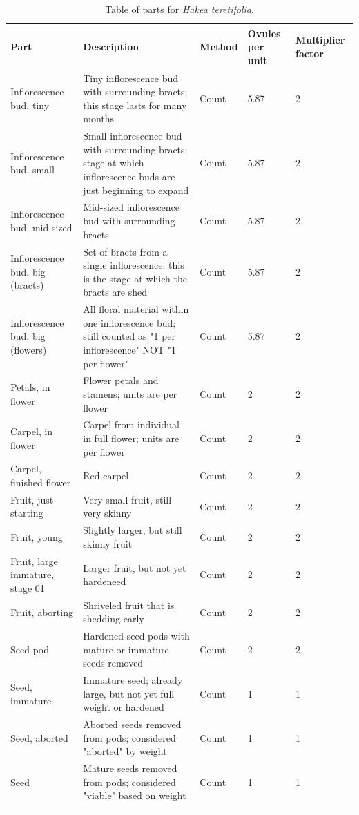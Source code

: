 \documentclass[10pt,twoside]{article}\usepackage[]{graphicx}\usepackage[]{color}
\begin{document}
\clearpage

\begingroup\small
\begin{longtable}{p{4.5cm}p{6cm}p{2cm}p{1cm}p{1cm}}
\caption{Table of parts for \emph{Hakea teretifolia}.} \\ 
  \hline
Part & Description & Method & Ovules per unit & Multiplier factor \\ 
  \hline
Inflorescence bud, tiny & Tiny inflorescence bud with surrounding bracts; this stage lasts for many months & Count & 5.87 &   2 \\ 
  Inflorescence bud, small & Small inflorescence bud with surrounding bracts; stage at which inflorescence buds are just beginning to expand & Count & 5.87 &   2 \\ 
  Inflorescence bud, mid-sized & Mid-sized inflorescence bud with surrounding bracts & Count & 5.87 &   2 \\ 
  Inflorescence bud, big (bracts) & Set of bracts from a single inflorescence; this is the stage at which the bracts are shed & Count & 5.87 &   2 \\ 
  Inflorescence bud, big (flowers) & All floral material within one inflorescence bud; still counted as "1 per inflorescence" NOT "1 per flower" & Count & 5.87 &   2 \\ 
  Petals, in flower & Flower petals and stamens; units are per flower & Count & 2 &   2 \\ 
  Carpel, in flower & Carpel from individual in full flower; units are per flower & Count & 2 &   2 \\ 
  Carpel, finished flower & Red carpel & Count & 2 &   2 \\ 
  Fruit, just starting & Very small fruit, still very skinny & Count & 2 &   2 \\ 
  Fruit, young & Slightly larger, but still skinny fruit & Count & 2 &   2 \\ 
  Fruit, large immature, stage 01 & Larger fruit, but not yet hardeneed & Count & 2 &   2 \\ 
  Fruit, aborting & Shriveled fruit that is shedding early & Count & 2 &   2 \\ 
  Seed pod & Hardened seed pods with mature or immature seeds removed & Count & 2 &   2 \\ 
  Seed, immature & Immature seed; already large, but not yet full weight or hardened & Count & 1 &   1 \\ 
  Seed, aborted & Aborted seeds removed from pods; considered "aborted" by weight & Count & 1 &   1 \\ 
  Seed & Mature seeds removed from pods; considered "viable" based on weight & Count & 1 &   1 \\ 
   \hline
\hline
\label{tab:parts_Hakea_teretifolia}
\end{longtable}
\endgroup
\end{document}
